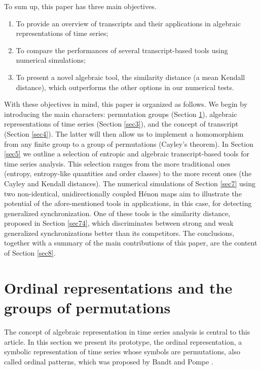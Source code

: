 \documentclass[%
 aip,
 amsmath,amssymb,
 reprint,%
]{revtex4-1}
\begin{document}
To sum up, this paper has three main objectives.

\begin{enumerate}
\item[(1)] To provide an overview of transcripts and their applications in
algebraic representations of time series;

\item[(2)] To compare the performances of several transcript-based tools
using numerical simulations;

\item[(3)] To present a novel algebraic tool, the similarity distance (a mean Kendall distance), which outperforms the other options in our numerical
tests.
\end{enumerate}

With these objectives in mind, this paper is organized as follows. We begin
by introducing the main characters: permutation groups (Section \ref{sec2}),
algebraic representations of time series (Section \ref{sec3}), and the
concept of transcript (Section \ref{sec4}). The latter will then allow us to
implement a homomorphism from any finite group to a group of permutations
(Cayley's theorem). In Section \ref{sec5} we outline a selection of
entropic and algebraic transcript-based tools for time series analysis. This
selection ranges from the more traditional ones (entropy, entropy-like
quantities and order classes) to the more recent ones (the Cayley and
Kendall distances). The numerical simulations of Section \ref{sec7} using
two non-identical, unidirectionally coupled H\'{e}non maps aim to illustrate
the potential of the afore-mentioned tools in applications, in this case,
for detecting generalized synchronization. One of these tools is the
similarity distance, proposed in Section \ref{sec74}, which discriminates
between strong and weak generalized synchronizations better than its
competitors. The conclusions, together with a summary of the main contributions of this paper, are the content of
Section \ref{sec8}.


\section{Ordinal representations and the groups of permutations}

\label{sec2}

The concept of algebraic representation in time series analysis is central
to this article. In this section we present its prototype, the ordinal
representation, a symbolic representation of time series whose symbols are
permutations, also called ordinal patterns, which was proposed by Bandt and
Pompe \cite{Bandt2002}.
\end{document}
